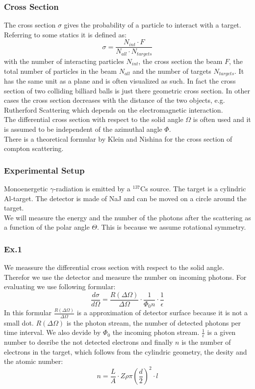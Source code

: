 \newpage

\subsubsection{Cross Section}
The cross section $\sigma$ gives the probability of a particle to interact with a target. Referring to some statics it is defined as:
$$\sigma = \frac{N_{int} \cdot F}{N_{all} \cdot N_{targets}} $$
with the number of interacting particles $N_{int}$, the cross section the beam $F$, the total number of particles in the beam $N_{all}$ and the number of targets $N_{targets}$. It has the same unit as a plane and is often visualized as such. In fact the cross section of two colliding billiard balls is just there geometric cross section. In other cases the cross section decreases with the distance of the two objects, e.g. Rutherford Scattering which depends on the electromagnetic interaction.\\
The differential cross section with respect to the solid angle $\Omega$ is often used and it is assumed to be independent of the azimuthal angle $\Phi$.\\
There is a theoretical formular by Klein and Nishina for the cross section of compton scattering.

\subsubsection{Experimental Setup}
Monoenergetic $\gamma$-radiation is emitted by a $^{137}$Cs source. The target is a cylindric Al-target. The detector is made of NaJ and can be moved on a circle around the target. \\
We will measure the energy and the number of the photons after the scattering as a function of the polar angle $\Theta$. This is because we assume rotational symmetry.

\subsubsection{Ex.1}
We meassure the differential cross section with respect to the solid angle. Therefor we use the detector and measure the number on incoming photons. For evaluating we use following formular:
$$\frac{d\sigma}{d\Omega} = \frac{R(\Delta \Omega)}{\Delta \Omega} \cdot \frac{1}{\Phi _0 n} \cdot \frac{1}{\epsilon} $$
In this formular $\frac{R(\Delta \Omega)}{\Delta \Omega}$ is a approximation of detector surface because it is not a small dot. $R(\Delta \Omega)$ is the photon stream, the number of detected photons per time interval. We also devide by $\Phi _0$ the incoming photon stream. $\frac{1}{\epsilon}$ is a given number to desribe the not detected electrons and finally $n$ is the number of electrons in the target, which follows from the cylindric geometry, the desity and the atomic number:
$$n =  \frac{L}{A} \cdot Z \rho \pi (\frac{d}{2})^{2} \cdot l $$

